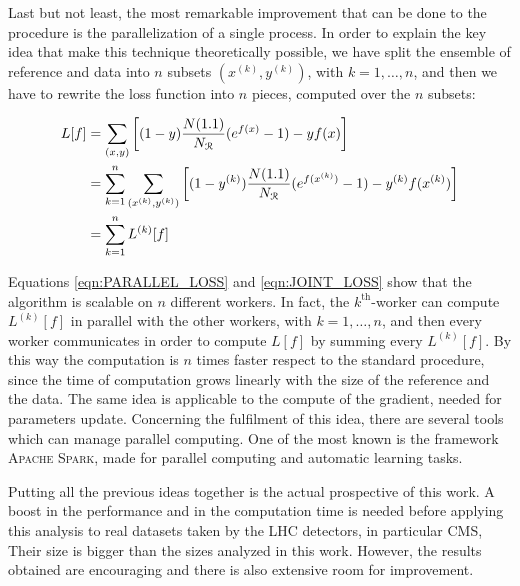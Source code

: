 Last but not least, the most remarkable improvement that can be done to the procedure is the parallelization of a single process. In order to explain the key idea that make this technique theoretically possible, we have split the ensemble of reference and data into $n$ subsets $(x^{(k)},y^{(k)})$, with $k=1,\dots,n$, and then we have to rewrite the loss function into $n$ pieces, computed over the $n$ subsets:

\begin{align}
	L[f]
	&= 
	\sum_{(x,y)} \left[
	(1-y) \frac{N(1.1)}{N_{\mathcal{R}}} (e^{f(x)} - 1) - yf(x)
	\right]	\nonumber \\
	&=
	\sum_{k=1}^{n} \sum_{(x^{(k)},y^{(k)})} \left[
	(1-y^{(k)}) \frac{N(1.1)}{N_{\mathcal{R}}} (e^{f(x^{(k)})} - 1) - y^{(k)}f(x^{(k)})
	\right]	\label{eqn:PARALLEL_LOSS}	\\
	&=
	\sum_{k=1}^{n}
	L^{(k)}[f]	\label{eqn:JOINT_LOSS}
\end{align}

\noindent
Equations \ref{eqn:PARALLEL_LOSS} and \ref{eqn:JOINT_LOSS} show that the algorithm is scalable on $n$ different workers. In fact, the $k^\text{th}$-worker can compute $L^{(k)}[f]$ in parallel with the other workers, with $k=1,\dots,n$, and then every worker communicates in order to compute $L[f]$ by summing every $L^{(k)}[f]$. By this way the computation is $n$ times faster respect to the standard procedure, since the time of computation grows linearly with the size of the reference and the data. The same idea is applicable to the compute of the gradient, needed for parameters update. Concerning the fulfilment of this idea, there are several tools which can manage parallel computing. One of the most known is the framework \textsc{Apache Spark}, made for parallel computing and automatic learning tasks.

\bigskip
Putting all the previous ideas together is the actual prospective of this work. A boost in the performance and in the computation time is needed before applying this analysis to real datasets taken by the LHC detectors, in particular CMS, Their size is bigger than the sizes analyzed in this work. However, the results obtained are encouraging and there is also extensive room for improvement.